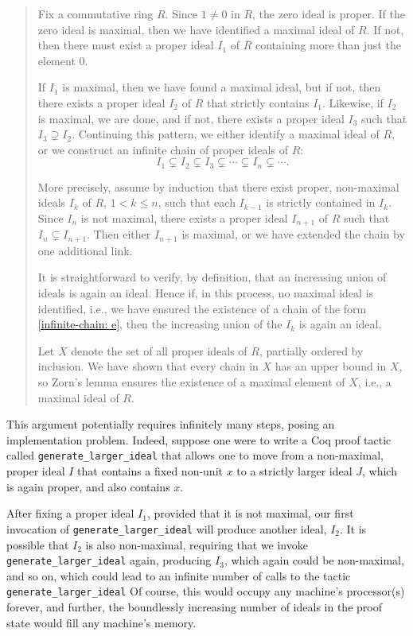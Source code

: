 \documentclass{article}
\begin{document}
\begin{quote}
Fix a commutative ring $R$.  Since $1 \neq 0$ in $R$, the zero ideal is proper.  
If the zero ideal is maximal, then we have identified a maximal ideal of $R$. 
If not, then there must exist a proper ideal 
$I_1$ of $R$ containing more than just the element $0$. 

If $I_1$ is maximal, then we have found a maximal ideal, but if not, then there exists a proper ideal 
$I_2$ of $R$ that strictly contains $I_1$.  
Likewise, if $I_2$ is maximal, we are done, and if not, there exists a proper ideal $I_3$ such that $I_3 \supsetneq I_2$.
Continuing this pattern, we either identify a maximal ideal of $R$, or we construct an infinite chain of proper ideals of $R$:
    \begin{equation} \label{infinite-chain: e}
    I_{1}\subsetneq I_{2}\subsetneq I_{3}\subsetneq\cdots\subsetneq I_n \subsetneq \cdots. 
    \end{equation}  
    
       More precisely, assume by induction that  there exist proper, non-maximal ideals 
   $I_k$ of $R$, $1 < k \leq n$, such that each $I_{k-1}$ is strictly contained in $I_k$.  
   Since $I_n$ is not maximal, there exists a proper ideal $I_{n+1}$ of $R$ such that $I_n \subsetneq I_{n+1}$.
      Then either $I_{n+1}$ is maximal, or we have extended the chain by one additional link. 

It is straightforward to verify, by definition, 
         that an increasing union of ideals 
    is again an ideal.
Hence if, in this process, no maximal ideal is identified, i.e., we have ensured the existence of a chain of the form \eqref{infinite-chain: e},  then the increasing union of the $I_k$ is again an ideal.
   
Let $X$ denote the set of all proper ideals of $R$, partially ordered by inclusion.
We have shown that every chain in $X$ has an upper bound in $X$, so  Zorn's lemma ensures the existence of a maximal element of $X$, i.e., a maximal ideal of \(R\). 
\end{quote}

This argument potentially requires infinitely many steps, posing an implementation
 problem. Indeed, suppose one were to write a Coq proof tactic called \texttt{generate_larger_ideal}
 that allows one to move from a non-maximal, proper ideal \(I\) that contains a fixed non-unit 
$x$ to a strictly larger ideal 
\(J \), which is again proper, and also contains \(x\). 

After fixing a proper ideal $I_1$, provided that it is not maximal, 
our first invocation of \texttt{generate_larger_ideal}
will produce another ideal, \(I_{2}\). It is possible that \(I_{2}\) is also non-maximal, 
requiring that we invoke \texttt{generate_larger_ideal}
again, producing $I_3$, which again could be non-maximal, and so on, 
which could lead to an infinite number of calls to the tactic
\texttt{generate_larger_ideal}
Of course, this would occupy any machine's
processor(s) forever, and further, the boundlessly increasing number of ideals in the proof
state would fill any machine's memory. 
\end{document}
